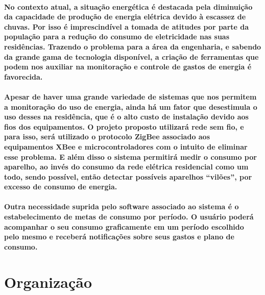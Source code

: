 \paragraph{
No contexto atual, a situação energética é destacada pela diminuição da capacidade de produção de energia elétrica devido à escassez de chuvas. Por isso é imprescindível a tomada de atitudes por parte da população para a redução do consumo de eletricidade nas suas residências. Trazendo o problema para a área da engenharia, e sabendo da grande gama de tecnologia disponível, a criação de ferramentas que podem nos auxiliar na monitoração e controle de gastos de energia é favorecida.
}
\paragraph{
Apesar de haver uma grande variedade de sistemas que nos permitem a monitoração do uso de energia, ainda há um fator que desestimula o uso desses na residência, que é o alto custo de instalação devido aos fios dos equipamentos. O projeto proposto utilizará rede sem fio, e para isso, será utilizado o protocolo ZigBee associado aos equipamentos XBee e microcontroladores com o intuito de eliminar esse problema. E além disso o sistema permitirá medir o consumo por aparelho, ao invés do consumo da rede elétrica residencial como um todo, sendo possível, então detectar possíveis aparelhos “vilões”, por excesso de consumo de energia.
}
\paragraph{
Outra necessidade suprida pelo software associado ao sistema é o estabelecimento de metas de consumo por período. O usuário poderá acompanhar o seu consumo graficamente em um período escolhido pelo mesmo e receberá notificações sobre seus gastos e plano de consumo.
}
\section{Organização}
\label{Sec:organizacao}

